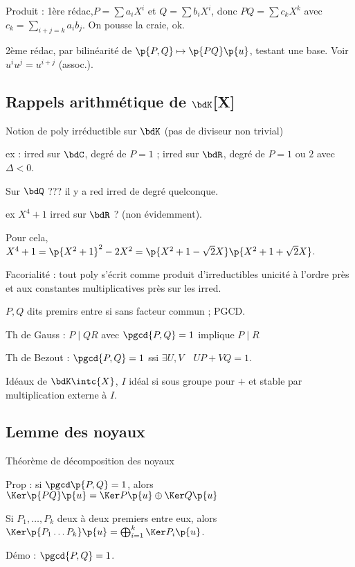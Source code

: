 \documentclass[a4paper,french,bookmarks]{book}
\begin{document}
    Produit : 1ère rédac,$P = \sum a_iX^i$ et $Q =\sum b_iX^i$, donc $PQ = \sum c_kX^k$ avec $c_k = \sum_{i+j = k} a_ib_j$. On pousse la craie, ok.
    
    2ème rédac, par bilinéarité de $\p{P, Q} \mapsto \p{PQ}\p{u}$, testant une base. Voir $u^iu^j = u^{i+j}$ (assoc.).
    
    \subsection{Rappels arithmétique de $\bdK$[X]}
    
    Notion de poly irréductible sur $\bdK$ (pas de diviseur non trivial)
    
    ex : irred sur $\bdC$, degré de $P = 1$ ; irred sur $\bdR$, degré de $P = 1$ ou $2$ avec $\Delta < 0$.
    
    Sur $\bdQ$ ??? il y a red irred de degré quelconque.
    
    ex $X^4 + 1$ irred sur $\bdR$ ? (non évidemment).
    
    Pour cela, $X^4 + 1 = \p{X^2 + 1}^2 - 2X^2 = \p{X^2 + 1 - \sqrt{2}X}\p{X^2 + 1 + \sqrt{2}X}$.
    
    Facorialité : tout poly s'écrit comme produit d'irreductibles unicité à l'ordre près et aux constantes multiplicatives près sur les irred.
    
    $P, Q$ dits premirs entre si sans facteur commun ; PGCD.
    
    Th de Gauss : $P \mid QR$ avec $\pgcd{P, Q} = 1$ implique $P \mid R$ 
    
    Th de Bezout : $\pgcd{P, Q} = 1$ ssi $\exists U, V \quad UP + VQ = 1$.
    
    Idéaux de $\bdK\intc{X}$, $I$ idéal si sous groupe pour $+$ et stable par multiplication externe à $I$.
    
    \subsection{Lemme des noyaux}
    
    Théorème de décomposition des noyaux
    
    Prop : si $\pgcd\p{P, Q} = 1$, alors $\Ker\p{PQ}\p{u} = \Ker P\p{u} \oplus \Ker Q\p{u}$
    
    Si $P_1, \dots, P_k$ deux à deux premiers entre eux, alors $\Ker\p{P_1 \dots P_k}\p{u} = \bigoplus_{i=1}^k \Ker P_i\p{u}$.
    
    Démo : $\pgcd{P, Q} = 1$.
    
\end{document}
